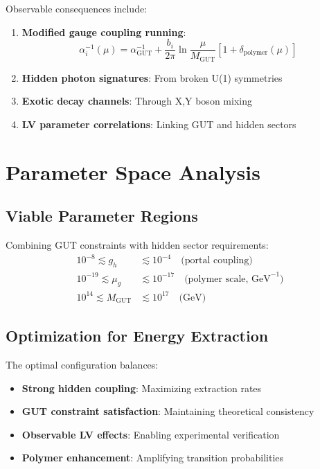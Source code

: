 \documentclass[11pt]{article}
\begin{document}
Observable consequences include:
\begin{enumerate}
    \item \textbf{Modified gauge coupling running}:
    \begin{equation}
    \alpha_i^{-1}(\mu) = \alpha_{\text{GUT}}^{-1} + \frac{b_i}{2\pi}\ln\frac{\mu}{M_{\text{GUT}}} \left[1 + \delta_{\text{polymer}}(\mu)\right]
    \end{equation}
    
    \item \textbf{Hidden photon signatures}: From broken U(1) symmetries
    
    \item \textbf{Exotic decay channels}: Through X,Y boson mixing
    
    \item \textbf{LV parameter correlations}: Linking GUT and hidden sectors
\end{enumerate}

\section{Parameter Space Analysis}

\subsection{Viable Parameter Regions}

Combining GUT constraints with hidden sector requirements:
\begin{align}
10^{-8} \lesssim g_h &\lesssim 10^{-4} \quad \text{(portal coupling)} \\
10^{-19} \lesssim \mu_g &\lesssim 10^{-17} \quad \text{(polymer scale, GeV}^{-1}) \\
10^{14} \lesssim M_{\text{GUT}} &\lesssim 10^{17} \quad \text{(GeV)}
\end{align}

\subsection{Optimization for Energy Extraction}

The optimal configuration balances:
\begin{itemize}
    \item \textbf{Strong hidden coupling}: Maximizing extraction rates
    \item \textbf{GUT constraint satisfaction}: Maintaining theoretical consistency
    \item \textbf{Observable LV effects}: Enabling experimental verification
    \item \textbf{Polymer enhancement}: Amplifying transition probabilities
\end{itemize}
\end{document}
